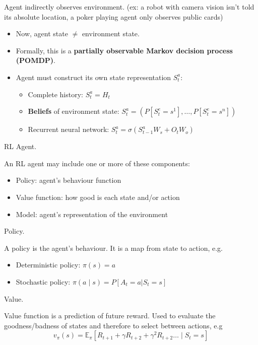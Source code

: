 \documentclass[english]{article}
\begin{document}
\begin{definition}
Agent indirectly observes environment. (ex: a robot with camera vision isn't told its absolute location, a poker playing agent only observes public cards)
\begin{itemize}
    \item Now, agent state $\neq$ environment state.
    \item Formally, this is a \textbf{partially observable Markov decision process (POMDP)}. 
    \item Agent must construct its own state representation $S^a_t$:
    \begin{itemize}
        \item Complete history: $S^a_t = H_t$
        \item \textbf{Beliefs} of environment state: $S^a_t = (P[S^e_t = s^1],\dots,P[S^e_t = s^n])$
        \item Recurrent neural network: $S^a_t = \sigma\left( S^a_{t-1}W_s + O_t W_o \right)$
    \end{itemize}
\end{itemize}
\end{definition}



\item {RL Agent}.

An RL agent may include one or more of these components:
\begin{itemize}
    \item Policy: agent's behaviour function
    \item Value function: how good is each state and/or action
    \item Model: agent's representation of the environment
\end{itemize}


\item {Policy}.

A policy is the agent's behaviour. It is a map from state to action, e.g.
\begin{itemize}
    \item Deterministic policy: $\pi(s) = a$
    \item Stochastic policy: $\pi(a\mid s) = P[A_t = a|S_t = s]$ 
\end{itemize}



\item {Value}.

Value function is a prediction of future reward. Used to evaluate the goodness/badness of states and therefore to select between actions, e.g
\[ v_\pi(s) = \mathbb{E}_\pi[R_{t+1} + \gamma R_{t+2} + \gamma^2 R_{t+2} \dots \mid S_t = s] \]
\end{document}
